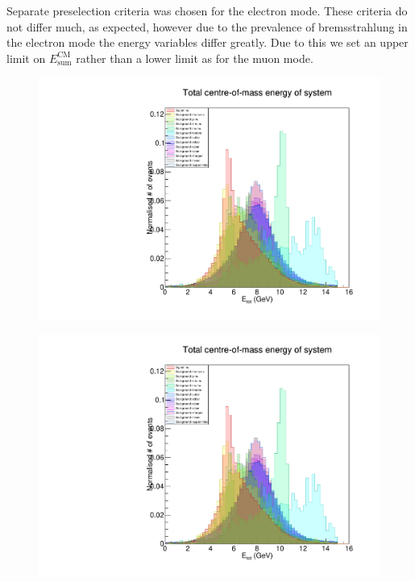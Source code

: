 \documentclass[12pt]{thesis}  %
\begin{document}
Separate preselection criteria was chosen for the electron mode. These criteria do not differ much, as expected, however due to the prevalence of bremsstrahlung in the electron mode the energy variables differ greatly. Due to this we set an upper limit on $E^{\text{CM}}_{\text{sum}}$ rather than a lower limit as for the muon mode.

\begin{figure}[h]
\centering
\begin{minipage}{.5\textwidth}
  \centering
  \includegraphics[width=\linewidth]{images/stack/stack_cut6_totalCM_E.pdf}
  \label{fig:test1}
\end{minipage}%
\begin{minipage}{.5\textwidth}
  \centering
  \includegraphics[width=\linewidth]{images/stack/stack_cut6_totalCM_E.pdf}
  \label{fig:test2}
\end{minipage}
\end{figure}
\end{document}

